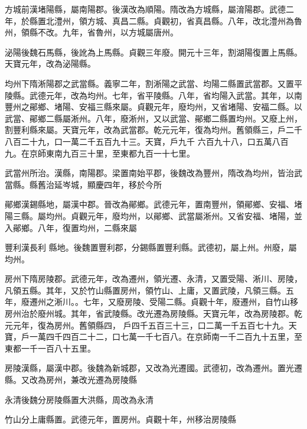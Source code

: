\begin{pinyinscope}
 方城前漢堵陽縣，屬南陽郡。後漢改為順陽。隋改為方城縣，屬淯陽郡。武德二年，於縣置北澧州，領方城、真昌二縣。貞觀初，省真昌縣。八年，改北澧州為魯州，領縣不改。九年，省魯州，以方城屬唐州。



 泌陽後魏石馬縣，後訛為上馬縣。貞觀三年廢。開元十三年，割湖陽復置上馬縣。天寶元年，改為泌陽縣。



 均州下隋淅陽郡之武當縣。義寧二年，割淅陽之武當、均陽二縣置武當郡。又置平陵縣。武德元年，改為均州。七年，省平陵縣。八年，省均陽入武當。其年，以南豐州之鄖鄉、堵陽、安福三縣來屬。貞觀元年，廢均州，又省堵陽、安福二縣。以武當、鄖鄉二縣屬淅州。八年，廢淅州，又以武當、鄖鄉二縣置均州。又廢上州，割豐利縣來屬。天寶元年，改為武當郡。乾元元年，復為均州。舊領縣三，戶二千八百二十九，口一萬二千五百九十三。天寶，戶九千
 六百九十八，口五萬八百九。在京師東南九百三十里，至東都九百一十七里。



 武當州所治。漢縣，南陽郡。梁置南始平郡，後魏改為豐州，隋改為均州，皆治武當縣。縣舊治延岑城，顯慶四年，移於今所



 鄖鄉漢錫縣地，屬漢中郡。晉改為鄖鄉。武德元年，置南豐州，領鄖鄉、安福、堵陽三縣。屬均州。貞觀元年，廢均州，以鄖鄉、武當屬淅州。又省安福、堵陽，並入鄖鄉。八年，復置均州，二縣來屬



 豐利漢長利
 縣地。後魏置豐利郡，分錫縣置豐利縣。武德初，屬上州。州廢，屬均州。



 房州下隋房陵郡。武德元年，改為遷州，領光遷、永清，又置受陽、淅川、房陵，凡領五縣。其年，又於竹山縣置房州，領竹山、上庸，又置武陵，凡領三縣。五年，廢遷州之淅川。。七年，又廢房陵、受陽二縣。貞觀十年，廢遷州，自竹山移房州治於廢州城。其年，省武陵縣。改光遷為房陵縣。天寶元年，改為房陵郡。乾元元年，復為房州。舊領縣四，
 戶四千五百三十三，口二萬一千五百七十九。天寶，戶一萬四千四百二十二，口七萬一千七百八。在京師南一千二百九十五里，至東都一千一百八十五里。



 房陵漢縣，屬漢中郡。後魏為新城郡，又改為光遷國。武德初，改為遷州。置光遷縣。又改為房州，兼改光遷為房陵縣



 永清後魏分房陵縣置大洪縣，周改為永清



 竹山分上庸縣置。武德元年，置房州。貞觀十年，州移治房陵縣




\end{pinyinscope}
